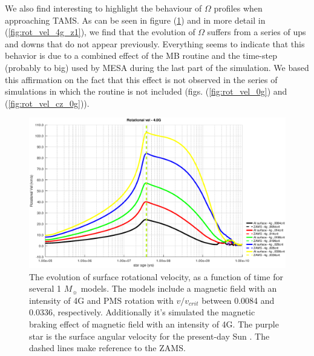 \documentclass[fleqn,usenatbib]{mnras}
\begin{document}
We also find interesting to highlight the behaviour of $\Omega$ profiles when approaching TAMS. As can be seen in figure (\ref{fig:rot_vel_4g}) and in more detail in (\ref{fig:rot_vel_4g_z1}), we find that the evolution of $\Omega$ suffers from a series of ups and downs that do not appear previously. Everything seems to indicate that this behavior is due to a combined effect of the MB routine and the time-step (probably to big) used by MESA during the last part of the simulation. We based this affirmation on the fact that this effect is not observed in the series of simulations in which the routine is not included (figs. (\ref{fig:rot_vel_0g}) and (\ref{fig:rot_vel_cz_0g})).\par

\begin{figure}
	\includegraphics[width=\columnwidth]{figures/rot_vel_4g.eps}
    \caption{The evolution of surface rotational velocity, as a function of time for several 1 $M_{\sun}$ models. The models include a magnetic field with an intensity of 4G and PMS rotation with $v/v_{crit}$ between 0.0084 and 0.0336, respectively. Additionally it's simulated the magnetic braking effect of magnetic field with an intensity of 4G. The purple star is the surface angular velocity for the present-day Sun \citep{Gill2012}. The dashed lines make reference to the ZAMS.}
    \label{fig:rot_vel_4g}
\end{figure}
\end{document}
